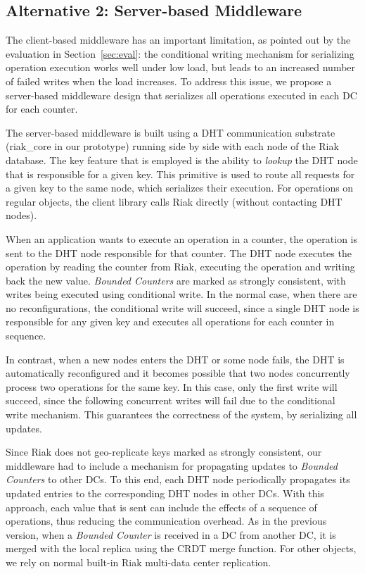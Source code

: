 \documentclass[conference]{IEEEtran}
\newcommand{\InvCounter}{\emph{Bounded Counter}}
\newcommand{\InvCounters}{\emph{Bounded Counters}}
\begin{document}
\subsection{Alternative 2: Server-based Middleware}\label{sec:deploy:srvmid}

The client-based middleware has an important limitation, as pointed out by the evaluation in Section~\ref{sec:eval}: 
the conditional writing mechanism for serializing operation execution works well under low load, 
but leads to an increased number of failed writes when the load increases. 
To address this issue, we propose a server-based middleware design that serializes
all operations executed in each DC for each counter.

The server-based middleware is built using a DHT communication substrate 
(riak\_core \cite{riakcore} in our prototype) running side by side with each
node of the Riak database. The key feature 
that is employed is the ability to {\em lookup} the DHT node that is 
responsible for a given key. 
This primitive is used to route all requests for a given key to the same node,
which serializes their execution.
For operations on regular objects, the client library calls Riak directly 
(without contacting DHT nodes). 

When an application wants to execute an operation in a counter, 
the operation is sent to the DHT node responsible for that counter. 
The DHT node executes the operation by reading the counter from Riak, executing
the operation and writing back the new value. \InvCounters{} are
marked as strongly consistent, with writes being executed using conditional write.
In the normal case, when there are no reconfigurations, the conditional write 
will succeed, since a single DHT node is responsible for any given key 
and executes all operations for each counter in sequence.

In contrast, when a new nodes enters the DHT or some node fails, 
the DHT is automatically reconfigured and it
becomes possible that two nodes concurrently
process two operations for the same key.
In this case, only the first write will succeed, since the following concurrent
writes will fail due to the conditional write mechanism.
This guarantees the correctness of the system, by serializing all
updates.

Since Riak does not geo-replicate keys marked as strongly consistent,
our middleware had to include a mechanism for propagating updates to \InvCounters{} 
to other DCs. 
To this end, each DHT node periodically propagates its updated entries to 
the corresponding DHT nodes in other DCs. 
With this approach, each value that is sent can include the effects of 
a sequence of operations, thus reducing the communication overhead.
As in the previous version, when a \InvCounter{} is received in a DC from another DC,
it is merged with the local replica using the CRDT merge function.
For other objects, we rely on normal built-in Riak multi-data center replication.
\end{document}
